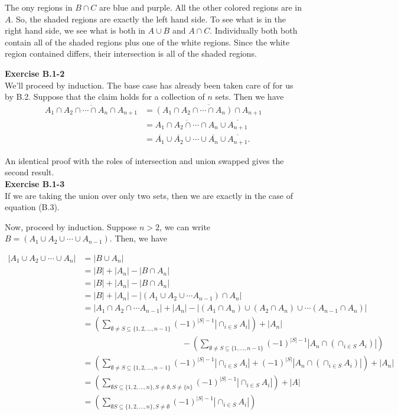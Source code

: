\documentclass{article}
\begin{document}
The ony regions in $B\cap C$ are blue and purple. All the other colored regions are in $A$. So, the shaded regions are exactly the left hand side. To see what is in the right hand side, we see what is both in $A\cup B$ and $A\cap C$. Individually both both contain all of the shaded regions plus one of the white regions. Since the white region contained differs, their intersection is all of the shaded regions.

\noindent\textbf{Exercise B.1-2}\\

We'll proceed by induction.  The base case has already been taken care of for us by B.2.  Suppose that the claim holds for a collection of $n$ sets.  Then we have 
\begin{align*}
\overline{A_1 \cap A_2 \cap \cdots \cap A_n \cap A_{n+1}} &= \overline{(A_1 \cap A_2 \cap \cdots \cap A_n) \cap A_{n+1}} \\
&= \overline{A_1 \cap A_2 \cap \cdots \cap A_n} \cup \overline{A_{n+1}} \\
&= \overline{A_1} \cup \overline{A_2} \cup \cdots \cup \overline{A_n} \cup \overline{A_{n+1}}.
\end{align*}

An identical proof with the roles of intersection and union swapped gives the second result.\\


\noindent\textbf{Exercise B.1-3}\\

 If we are taking the union over only two sets, then we are exactly in the case of equation (B.3).

Now, proceed by induction. Suppose $n>2$, we can write $B = (A_1 \cup A_2 \cup \cdots \cup A_{n-1})$. Then, we have

\begin{align*}
|A_1\cup A_2 \cup \cdots \cup A_n| &= |B\cup A_n|\\
&= |B| + |A_n| - |B \cap A_n|\\
&= |B| + |A_n| - |B \cap A_n|\\
&= |B| + |A_n| - |\left( A_1\cup A_2 \cup \cdots A_{n-1}\right)\cap A_n|\\
&= |A_1 \cap A_2 \cap \cdots A_{n-1}| + |A_n| - |(A_1\cap A_n)\cup (A_2\cap A_n) \cup \cdots (A_{n-1}\cap A_n)|\\
&= \left(\sum_{\emptyset\neq S\subseteq\{1,2,\ldots, n-1\}}(-1)^{|S|-1}  \left|\cap_{i\in S} A_i\right|\right) + |A_n| \\
&\hspace{2in}- \left(\sum_{\emptyset\neq S\subseteq \{1,\ldots, n-1\}} (-1)^{|S|-1} |A_n \cap (\cap_{i\in S} A_i)| \right)\\
&= \left(\sum_{\emptyset\neq S\subseteq\{1,2,\ldots, n-1\}}(-1)^{|S|-1}  \left|\cap_{i\in S} A_i\right| + (-1)^{|S|}|A_n \cap (\cap_{i\in S} A_i)| \right) + |A_n|\\
&= \left(\sum_{\emptyset S\subseteq\{1,2,\ldots, n\}, S\neq\emptyset, S\neq \{n\}}(-1)^{|S|-1}  \left|\cap_{i\in S} A_i\right|  \right)+|A|\\
&= \left(\sum_{\emptyset S\subseteq\{1,2,\ldots, n\}, S\neq\emptyset}(-1)^{|S|-1}  \left|\cap_{i\in S} A_i\right|  \right)
\end{align*}
\end{document}
